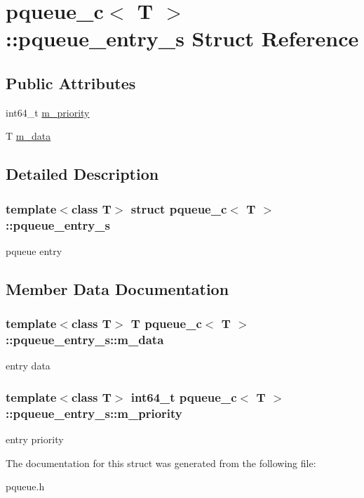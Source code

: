 \hypertarget{structpqueue__c_1_1pqueue__entry__s}{
\section{pqueue\_\-c$<$ T $>$::pqueue\_\-entry\_\-s Struct Reference}
\label{structpqueue__c_1_1pqueue__entry__s}
}
\subsection*{Public Attributes}
\begin{DoxyCompactItemize}
\item 
int64\_\-t \hyperlink{structpqueue__c_1_1pqueue__entry__s_a0b6eebe77000c960278f55cb84693dda}{m\_\-priority}
\item 
T \hyperlink{structpqueue__c_1_1pqueue__entry__s_afdb416e37000cc4ebca66ea56ba7dbfd}{m\_\-data}
\end{DoxyCompactItemize}


\subsection{Detailed Description}
\subsubsection*{template$<$class T$>$ struct pqueue\_\-c$<$ T $>$::pqueue\_\-entry\_\-s}

pqueue entry 

\subsection{Member Data Documentation}
\hypertarget{structpqueue__c_1_1pqueue__entry__s_afdb416e37000cc4ebca66ea56ba7dbfd}{
\subsubsection[{m\_\-data}]{\setlength{\rightskip}{0pt plus 5cm}template$<$class T$>$ T {\bf pqueue\_\-c}$<$ T $>$::{\bf pqueue\_\-entry\_\-s::m\_\-data}}}
\label{structpqueue__c_1_1pqueue__entry__s_afdb416e37000cc4ebca66ea56ba7dbfd}
entry data \hypertarget{structpqueue__c_1_1pqueue__entry__s_a0b6eebe77000c960278f55cb84693dda}{
\subsubsection[{m\_\-priority}]{\setlength{\rightskip}{0pt plus 5cm}template$<$class T$>$ int64\_\-t {\bf pqueue\_\-c}$<$ T $>$::{\bf pqueue\_\-entry\_\-s::m\_\-priority}}}
\label{structpqueue__c_1_1pqueue__entry__s_a0b6eebe77000c960278f55cb84693dda}
entry priority 

The documentation for this struct was generated from the following file:\begin{DoxyCompactItemize}
\item 
pqueue.h\end{DoxyCompactItemize}
